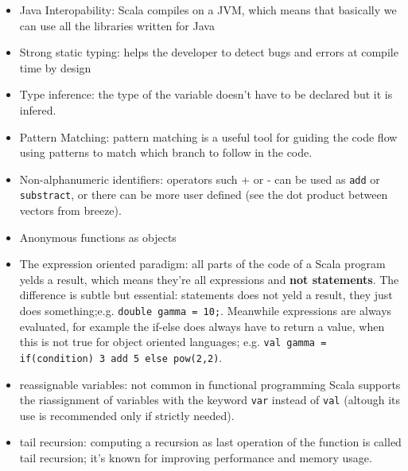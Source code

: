 \documentclass{sig-alternate-05-2015}
\begin{document}
\begin{itemize}
    \item Java Interopability: Scala compiles on a JVM, which means that basically we
    can use all the libraries written for Java
    \item Strong static typing: helps the developer to detect bugs and errors at compile time by design
    \item Type inference: the type of the variable doesn't have to be declared but it is infered.
    \item Pattern Matching: pattern matching is a useful tool for guiding the code flow using
    patterns to match which branch to follow in the code.
    \item Non-alphanumeric identifiers: operators such + or - can be used as \texttt{add} or \texttt{substract}, or
    there can be more user defined (see the dot product between vectors from breeze).
    \item Anonymous functions as objects
    \item The expression oriented paradigm: all parts of the code of a Scala program yelds a result, which means they're all
    expressions and \textbf{not statements}. The difference is subtle but essential: statements does not yeld a result, they
    just does something;e.g. \texttt{double gamma = 10;}. Meanwhile expressions are always evaluated, for example the if-else does
    always have to return a value, when this is not true for object oriented languages; e.g. \texttt{val gamma = if(condition) 3 add 5 else pow(2,2)}.
    \item reassignable variables: not common in functional programming Scala supports the riassignment of variables with the
    keyword \texttt{var} instead of \texttt{val} (altough its use is recommended only if strictly needed).
    \item tail recursion: computing a recursion as last operation of the function is called tail recursion; it's known for improving
    performance and memory usage.
\end{itemize}
\end{document}
